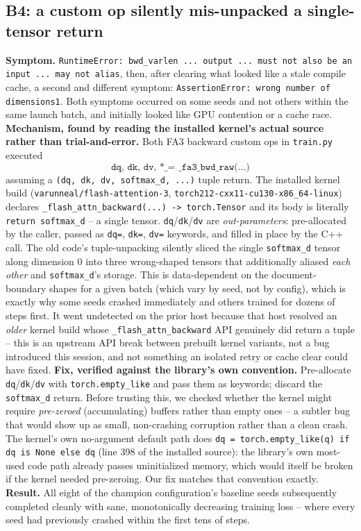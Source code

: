 \documentclass{article}
\begin{document}
\subsection{B4: a custom op silently mis-unpacked a single-tensor return}
\textbf{Symptom.} \texttt{RuntimeError: bwd\_varlen ... output ... must not also be an input ... may not alias}, then, after clearing what looked like a stale compile cache, a second and different symptom: \texttt{AssertionError: wrong number of dimensions1}. Both symptoms occurred on some seeds and not others within the same launch batch, and initially looked like GPU contention or a cache race.
\textbf{Mechanism, found by reading the installed kernel's actual source rather than trial-and-error.} Both FA3 backward custom ops in \texttt{train.py} executed
\[
\texttt{dq, dk, dv, *\_ = \_fa3\_bwd\_raw(...)}
\]
assuming a \texttt{(dq, dk, dv, softmax\_d, ...)} tuple return. The installed kernel build (\texttt{varunneal/flash-attention-3}, \texttt{torch212-cxx11-cu130-x86\_64-linux}) declares \texttt{\_flash\_attn\_backward(...) -> torch.Tensor} and its body is literally \texttt{return softmax\_d} -- a single tensor. \texttt{dq}/\texttt{dk}/\texttt{dv} are \emph{out-parameters}: pre-allocated by the caller, passed as \texttt{dq=}, \texttt{dk=}, \texttt{dv=} keywords, and filled in place by the C++ call. The old code's tuple-unpacking silently sliced the single \texttt{softmax\_d} tensor along dimension 0 into three wrong-shaped tensors that additionally aliased \emph{each other} and \texttt{softmax\_d}'s storage. This is data-dependent on the document-boundary shapes for a given batch (which vary by seed, not by config), which is exactly why some seeds crashed immediately and others trained for dozens of steps first. It went undetected on the prior host because that host resolved an \emph{older} kernel build whose \texttt{\_flash\_attn\_backward} API genuinely did return a tuple -- this is an upstream API break between prebuilt kernel variants, not a bug introduced this session, and not something an isolated retry or cache clear could have fixed.
\textbf{Fix, verified against the library's own convention.} Pre-allocate \texttt{dq}/\texttt{dk}/\texttt{dv} with \texttt{torch.empty\_like} and pass them as keywords; discard the \texttt{softmax\_d} return. Before trusting this, we checked whether the kernel might require \emph{pre-zeroed} (accumulating) buffers rather than empty ones -- a subtler bug that would show up as small, non-crashing corruption rather than a clean crash. The kernel's own no-argument default path does \texttt{dq = torch.empty\_like(q) if dq is None else dq} (line 398 of the installed source): the library's own most-used code path already passes uninitialized memory, which would itself be broken if the kernel needed pre-zeroing. Our fix matches that convention exactly.
\textbf{Result.} All eight of the champion configuration's baseline seeds subsequently completed cleanly with sane, monotonically decreasing training loss -- where every seed had previously crashed within the first tens of steps.
\end{document}
